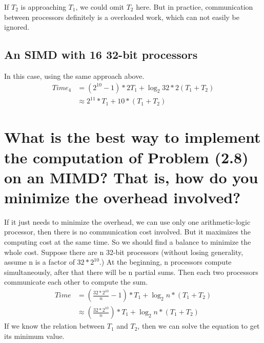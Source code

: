 \documentclass[12pt,a4paper]{report}
\begin{document}
If $T_{2}$ is approaching $T_{1}$, we could omit $T_{2}$ here. But in practice, communication between processors definitely is a overloaded work, which can not easily be ignored.
\subsection{An SIMD with 16 32-bit processors}
In this case, using the same approach above. \\
\begin{equation*}
\begin{split}
Time_{4}& = (2^{10} -1 ) * 2T_{1} + \log_{2}32 * 2(T_{1} + T_{2}) \\
& \approx 2^{11} * T_{1} + 10 * (T_{1} + T_{2})
\end{split}
\end{equation*}

\section{What is the best way to implement the computation of Problem (2.8) on an MIMD? That is, how do you minimize the overhead involved?}
If it just needs to minimize the overhead, we can use only one arithmetic-logic processor, then there is no communication cost involved. But it maximizes the computing cost at the same time. So we should find a balance to minimize the whole cost.
Suppose there are n 32-bit processors (without losing generality, assume n is a factor of $32 * 2^{10}$.) At the beginning, n processors compute simultaneously, after that there will be n partial sums. Then each two processors communicate each other to compute the sum.
\begin{equation*}
\begin{split}
Time & = (\frac {32 * 2^{10}} {n} - 1) * T_{1} + \log_{2}n * (T_{1} + T_{2}) \\
& \approx (\frac {32 * 2^{10}} {n}) * T_{1} + \log_{2}n * (T_{1} + T_{2})
\end{split}
\end{equation*}
If we know the relation between $T_{1}$ and $T_{2}$, then we can solve the equation to get its minimum value.
\end{document}
